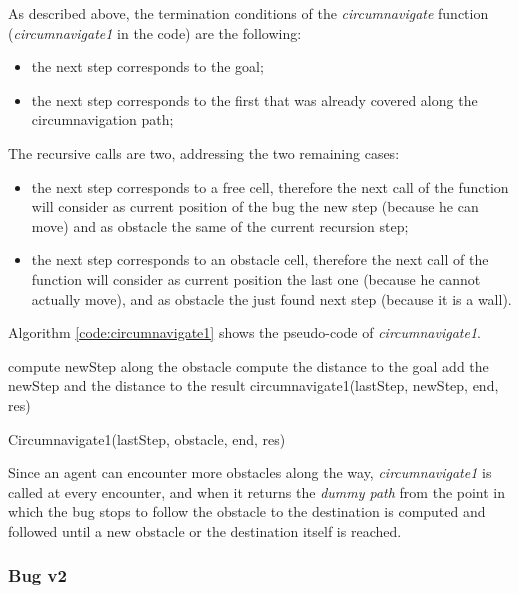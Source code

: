 \documentclass[conference]{IEEEtran}
\begin{document}
As described above, the termination conditions of the \emph{circumnavigate} function (\emph{circumnavigate1} in the code) are the following:
\begin{itemize}
	\item the next step corresponds to the goal;
	\item the next step corresponds to the first that was already covered along the circumnavigation path;
\end{itemize}

The recursive calls are two, addressing the two remaining cases:
\begin{itemize}
	\item the next step corresponds to a free cell, therefore the next call of the function will consider as current position of the bug the new step (because he can move) and as obstacle the same of the current recursion step;
	\item the next step corresponds to an obstacle cell, therefore the next call of the function will consider as current position the last one (because he cannot actually move), and as obstacle the just found next step (because it is a wall).
\end{itemize}

Algorithm \ref{code:circumnavigate1} shows the pseudo-code of \emph{circumnavigate1}.

\begin{algorithm}
	compute newStep along the obstacle\;
	compute the distance to the goal\;
	add the newStep and the distance to the result\;
	\Return circumnavigate1(lastStep, newStep, end, res)\;
	\label{code:circumnavigate1}
	\caption{Circumnavigate1(lastStep, obstacle, end, res)}
\end{algorithm}

Since an agent can encounter more obstacles along the way, \emph{circumnavigate1} is called at every encounter, and when it returns the \textit{dummy path} from the point in which the bug stops to follow the obstacle to the destination is computed and followed until a new obstacle or the destination itself is reached.

\subsubsection{Bug v2}
\end{document}
